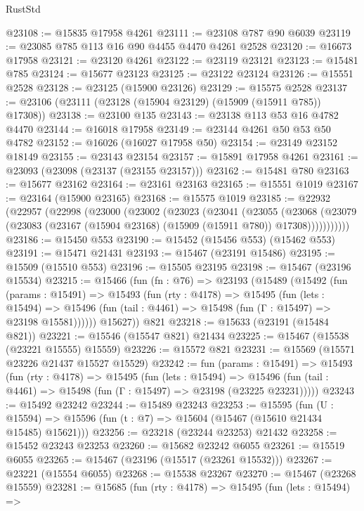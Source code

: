 \begin{lexlean}{RustStd}
\begin{coremodule}
@23108 := @15835 @17958 @4261
@23111 := @23108 @787 @90 @6039
@23119 := @23085 @785 @113 @16 @90 @4455 @4470 @4261 @2528
@23120 := @16673 @17958
@23121 := @23120 @4261
@23122 := @23119 @23121
@23123 := @15481 @785
@23124 := @15677 @23123
@23125 := @23122 @23124
@23126 := @15551 @2528
@23128 := @23125 (@15900 @23126)
@23129 := @15575 @2528
@23137 := @23106 (@23111 (@23128 (@15904 @23129) (@15909 (@15911 @785)) @17308))
@23138 := @23100 @135
@23143 := @23138 @113 @53 @16 @4782 @4470
@23144 := @16018 @17958
@23149 := @23144 @4261 @50 @53 @50 @4782
@23152 := @16026 (@16027 @17958 @50)
@23154 := @23149 @23152 @18149
@23155 := @23143 @23154
@23157 := @15891 @17958 @4261
@23161 := @23093 (@23098 (@23137 (@23155 @23157)))
@23162 := @15481 @780
@23163 := @15677 @23162
@23164 := @23161 @23163
@23165 := @15551 @1019
@23167 := @23164 (@15900 @23165)
@23168 := @15575 @1019
@23185 := @22932
    (@22957
      (@22998
        (@23000
          (@23002
            (@23023
              (@23041
                (@23055
                  (@23068
                    (@23079 (@23083 (@23167 (@15904 @23168) (@15909 (@15911 @780)) @17308)))))))))))
@23186 := @15450 @553
@23190 := @15452 (@15456 @553) (@15462 @553)
@23191 := @15471 @21431
@23193 := @15467 (@23191 @15486)
@23195 := @15509 (@15510 @553)
@23196 := @15505 @23195
@23198 := @15467 (@23196 @15534)
@23215 := @15466
    (fun (fn : @76) =>
    @23193
      (@15489
        (@15492
          (fun (params : @15491) =>
          @15493
            (fun (rty : @4178) =>
            @15495
              (fun (lets : @15494) =>
              @15496 (fun (tail : @4461) => @15498 (fun (Γ : @15497) => @23198 @15581))))))
        @15627))
    @821
@23218 := @15633 (@23191 (@15484 @821))
@23221 := @15546 (@15547 @821) @21434
@23225 := @15467 (@15538 (@23221 @15555) @15559)
@23226 := @15572 @821
@23231 := @15569 (@15571 @23226 @21437 @15527 @15529)
@23242 := fun (params : @15491) =>
  @15493
    (fun (rty : @4178) =>
    @15495
      (fun (lets : @15494) =>
      @15496 (fun (tail : @4461) => @15498 (fun (Γ : @15497) => @23198 (@23225 @23231)))))
@23243 := @15492 @23242
@23244 := @15489 @23243
@23253 := @15595
    (fun (U : @15594) => @15596 (fun (t : @7) => @15604 (@15467 (@15610 @21434 @15485) @15621)))
@23256 := @23218 (@23244 @23253) @21432
@23258 := @15452 @23243 @23253
@23260 := @15682 @23242 @6055
@23261 := @15519 @6055
@23265 := @15467 (@23196 (@15517 (@23261 @15532)))
@23267 := @23221 (@15554 @6055)
@23268 := @15538 @23267
@23270 := @15467 (@23268 @15559)
@23281 := @15685
    (fun (rty : @4178) =>
    @15495
      (fun (lets : @15494) =>

\end{coremodule}
\end{lexlean}
